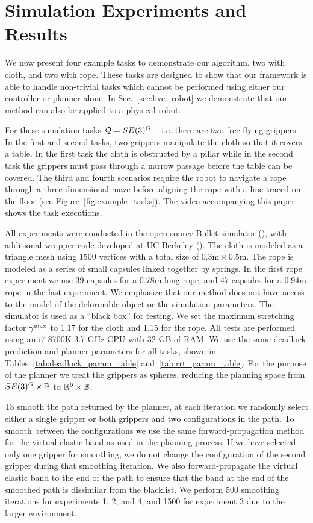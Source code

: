 \section{Simulation Experiments and Results}
\label{sec:simulation_experiments}

We now present four example tasks to demonstrate our algorithm, two with cloth, and two with rope. These tasks are designed to show that our framework is able to handle non-trivial tasks which cannot be performed using either our controller or planner alone. In Sec.~\ref{sec:live_robot} we demonstrate that our method can also be applied to a physical robot.

For these simulation tasks $\mathcal{Q} = SE(3)^G$ -- i.e. there are two free flying grippers. In the first and second tasks, two grippers manipulate the cloth so that it covers a table. In the first task the cloth is obstructed by a pillar while in the second task the grippers must pass through a narrow passage before the table can be covered. The third and fourth scenarios require the robot to navigate a rope through a three-dimensional maze before aligning the rope with a line traced on the floor (see Figure~\ref{fig:example_tasks}). The video accompanying this paper shows the task executions.


All experiments were conducted in the open-source Bullet simulator (\cite{Coumans2010}), with additional wrapper code developed at UC Berkeley 
(\cite{ucberkley_bullet}). The cloth is modeled as a triangle mesh using 1500 vertices with a total size of $0.3\text{m} \times 0.5\text{m}$. The rope is modeled as a series of small capsules linked together by springs. In the first rope experiment we use 39 capsules for a 0.78m long rope, and 47 capsules for a 0.94m rope in the last experiment. We emphasize that our method does not have access to the model of the deformable object or the simulation parameters. The simulator is used as a ``black box'' for testing. We set the maximum stretching factor $\gamma^{\textrm{max}}$ to 1.17 for the cloth and 1.15 for the rope. All tests are performed using an i7-8700K 3.7 GHz CPU with 32 GB of RAM. We use the same deadlock prediction and planner parameters for all tasks, shown in Tables~\ref{tab:deadlock_param_table} and~\ref{tab:rrt_param_table}. For the purpose of the planner we treat the grippers as spheres, reducing the planning space from $SE(3)^G \times \mathbb{B}$ to $\mathbb{R}^6 \times \mathbb{B}$.

To smooth the path returned by the planner, at each iteration we randomly select either a single gripper or both grippers and two configurations in the path. To smooth between the configurations we use the same forward-propagation method for the virtual elastic band as used in the planning process. If we have selected only one gripper for smoothing, we do not change the configuration of the second gripper during that smoothing iteration. We also forward-propagate the virtual elastic band to the end of the path to ensure that the band at the end of the smoothed path is dissimilar from the blacklist. We perform 500 smoothing iterations for experiments 1, 2, and 4; and 1500 for experiment 3 due to the larger environment.




